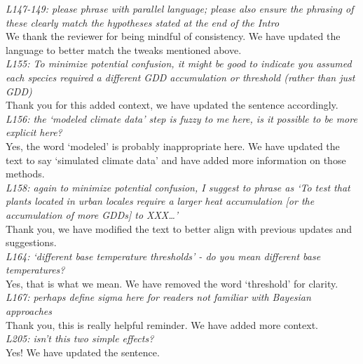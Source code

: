 \documentclass[11pt,a4paper]{article}\usepackage[]{graphicx}\usepackage[]{color}
\begin{document}
\textit{L147-149: please phrase with parallel language; please also ensure the phrasing of these clearly match the hypotheses stated at the end of the Intro} \\

We thank the reviewer for being mindful of consistency. We have updated the language to better match the tweaks mentioned above. \\

\textit{L155: To minimize potential confusion, it might be good to indicate you assumed each species required a different GDD accumulation or threshold (rather than just GDD)} \\

Thank you for this added context, we have updated the sentence accordingly. \\

\textit{L156: the `modeled climate data' step is fuzzy to me here, is it possible to be more explicit here?} \\

Yes, the word `modeled' is probably inappropriate here. We have updated the text to say `simulated climate data' and have added more information on those methods. \\

\textit{L158: again to minimize potential confusion, I suggest to phrase as `To test that plants located in urban locales require a larger heat accumulation [or the accumulation of more GDDs] to XXX…'} \\

Thank you, we have modified the text to better align with previous updates and suggestions. \\

\textit{L164: `different base temperature thresholds' - do you mean different base temperatures?} \\

Yes, that is what we mean. We have removed the word `threshold' for clarity. \\

\textit{L167: perhaps define sigma here for readers not familiar with Bayesian approaches} \\

Thank you, this is really helpful reminder. We have added more context. \\

\textit{L205: isn't this two simple effects?} \\

Yes! We have updated the sentence. \\
\end{document}
